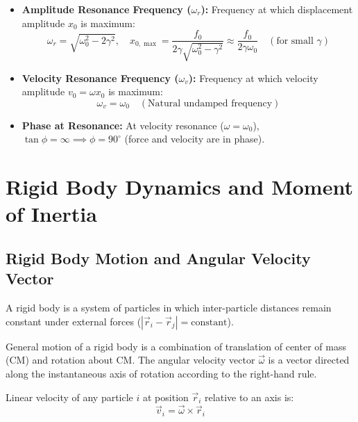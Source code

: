 \documentclass[12pt,a4paper]{article}
\begin{document}
\begin{tcolorbox}[formulabox, title={\textbf{Resonance Conditions}}]
\begin{itemize}[leftmargin=*, itemsep=3pt]
  \item \textbf{Amplitude Resonance Frequency ($\omega_r$):} Frequency at which displacement amplitude $x_0$ is maximum:
  \begin{equation}
  \omega_r = \sqrt{\omega_0^2 - 2\gamma^2}, \quad x_{0,\max} = \frac{f_0}{2\gamma \sqrt{\omega_0^2 - \gamma^2}} \approx \frac{f_0}{2\gamma \omega_0} \quad (\text{for small } \gamma)
  \end{equation}
  \item \textbf{Velocity Resonance Frequency ($\omega_v$):} Frequency at which velocity amplitude $v_0 = \omega x_0$ is maximum:
  \begin{equation}
  \omega_v = \omega_0 \quad (\text{Natural undamped frequency})
  \end{equation}
  \item \textbf{Phase at Resonance:} At velocity resonance ($\omega = \omega_0$), $\tan\phi = \infty \implies \phi = 90^\circ$ (force and velocity are in phase).
\end{itemize}
\end{tcolorbox}

\section{Rigid Body Dynamics and Moment of Inertia}

\subsection{Rigid Body Motion and Angular Velocity Vector}

A rigid body is a system of particles in which inter-particle distances remain constant under external forces ($|\vec{r}_i - \vec{r}_j| = \text{constant}$).

General motion of a rigid body is a combination of translation of center of mass (CM) and rotation about CM. The angular velocity vector $\vec{\omega}$ is a vector directed along the instantaneous axis of rotation according to the right-hand rule.

Linear velocity of any particle $i$ at position $\vec{r}_i$ relative to an axis is:
\begin{equation}
\vec{v}_i = \vec{\omega} \times \vec{r}_i
\end{equation}
\end{document}

